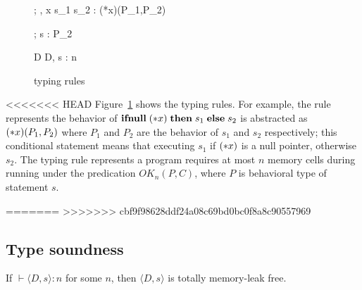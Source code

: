 \begin{figure}
\begin{minipage}{\textwidth}
{\Theta ; \Gamma, x \vdash \IFNULL\Sirx \; \THEN s_{1}\; \ELSE s_{2} : (*x)(P_1,P_2)}


{\Theta ; \Gamma \vdash s : P_{2}}

        {\vdash D \COL \Theta}
{\vdash \langle D, s \rangle : n}

\end{minipage}
\caption{typing rules}
\label{fig:TypingRules}
\end{figure}

<<<<<<< HEAD
Figure~\ref{fig:TypingRules} shows the typing rules. For example, the
rule  represents the behavior of \(\mathbf{ifnull}\;(*x) \; \mathbf{then}\;
s_{1}\; \mathbf{else}\; s_{2}\) is abstracted as \((*x)(P_1, P_2)\) where
\(P_1\) and \(P_2\) are the behavior of \(s_1\) and \(s_2\)
respectively; this conditional statement means that executing \(s_1\)
if \((*x)\) is a null pointer, otherwise \(s_2\).  The typing rule
 represents a program requires at most \(n\) memory
cells during running under the predication \(OK_n(P, C)\), where \(P\)
is behavioral type of statement \(s\).


=======
>>>>>>> cbf9f98628ddf24a08c69bd0bc0f8a8c90557969
\subsection{Type soundness}
\begin{theorem}\label{thm1}
If $\vdash \langle D, s \rangle : n$ for some \(n\), then \(\langle D,
s \rangle\) is totally memory-leak free.
\end{theorem}


